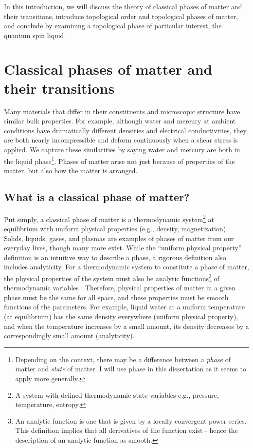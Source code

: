 In this introduction, we will discuss the theory of classical phases of matter and their transitions, introduce topological order and topological phases of matter, and conclude by examining a topological phase of particular interest, the quantum spin liquid.

\section{Classical phases of matter and their transitions}
Many materials that differ in their constituents and microscopic structure have similar bulk properties. For example, although water and mercury at ambient conditions have dramatically different densities and electrical conductivities, they are both nearly incompressible and deform continuously when a shear stress is applied. We capture these similarities by saying water and mercury are both in the liquid phase\footnote{Depending on the context, there may be a difference between a \textit{phase} of matter and \textit{state} of matter. I will use phase in this dissertation as it seems to apply more generally.}. Phases of matter arise not just because of properties of the matter, but also how the matter is arranged.

\subsection{What is a classical phase of matter?}

Put simply, a classical phase of matter is a thermodynamic system\footnote{A system with defined thermodynamic state variables e.g., pressure, temperature, entropy.} at equilibrium with uniform physical properties (e.g., density, magnetization). Solids, liquids, gases, and plasmas are examples of phases of matter from our everyday lives, though many more exist. While the ``uniform physical property'' definition is an intuitive way to describe a phase, a rigorous definition also includes analyticity. For a thermodynamic system to constitute a phase of matter, the physical properties of the system must also be analytic functions\footnote{An analytic function is one that is given by a locally convergent power series. This definition implies that all derivatives of the function exist - hence the description of an analytic function as smooth.} of thermodynamic variables \cite{Pathria2011}. Therefore, physical properties of matter in a given phase must be the same for all space, and these properties must be smooth functions of the parameters. For example, liquid water at a uniform temperature (at equilibrium) has the same density everywhere (uniform physical property), and when the temperature increases by a small amount, its density decreases by a correspondingly small amount (analyticity).

